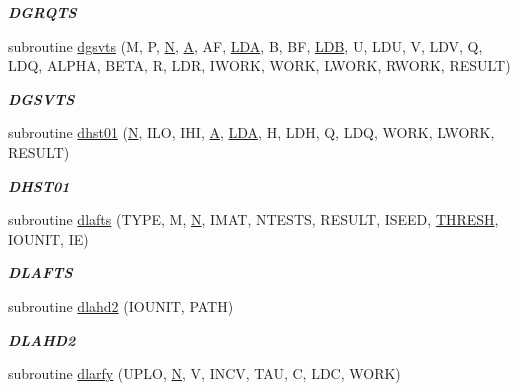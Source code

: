 \begin{DoxyCompactItemize}
\begin{DoxyCompactList}\small\item\em {\bfseries D\+G\+R\+Q\+T\+S} \end{DoxyCompactList}\item 
subroutine \hyperlink{group__double__eig_gae3ad62ba253b56ff68e7007244ce988e}{dgsvts} (M, P, \hyperlink{polmisc_8c_a0240ac851181b84ac374872dc5434ee4}{N}, \hyperlink{classA}{A}, A\+F, \hyperlink{example__user_8c_ae946da542ce0db94dced19b2ecefd1aa}{L\+D\+A}, B, B\+F, \hyperlink{example__user_8c_a50e90a7104df172b5a89a06c47fcca04}{L\+D\+B}, U, L\+D\+U, V, L\+D\+V, Q, L\+D\+Q, A\+L\+P\+H\+A, B\+E\+T\+A, R, L\+D\+R, I\+W\+O\+R\+K, W\+O\+R\+K, L\+W\+O\+R\+K, R\+W\+O\+R\+K, R\+E\+S\+U\+L\+T)
\begin{DoxyCompactList}\small\item\em {\bfseries D\+G\+S\+V\+T\+S} \end{DoxyCompactList}\item 
subroutine \hyperlink{group__double__eig_ga2c2bc3739bff16d2f68bcce82a72e5bb}{dhst01} (\hyperlink{polmisc_8c_a0240ac851181b84ac374872dc5434ee4}{N}, I\+L\+O, I\+H\+I, \hyperlink{classA}{A}, \hyperlink{example__user_8c_ae946da542ce0db94dced19b2ecefd1aa}{L\+D\+A}, H, L\+D\+H, Q, L\+D\+Q, W\+O\+R\+K, L\+W\+O\+R\+K, R\+E\+S\+U\+L\+T)
\begin{DoxyCompactList}\small\item\em {\bfseries D\+H\+S\+T01} \end{DoxyCompactList}\item 
subroutine \hyperlink{group__double__eig_ga6f9c26a927bb292ac5cab99adc1a357c}{dlafts} (T\+Y\+P\+E, M, \hyperlink{polmisc_8c_a0240ac851181b84ac374872dc5434ee4}{N}, I\+M\+A\+T, N\+T\+E\+S\+T\+S, R\+E\+S\+U\+L\+T, I\+S\+E\+E\+D, \hyperlink{zlaqgs_8c_a0656018abfc9fa2821827415f5d5ea57}{T\+H\+R\+E\+S\+H}, I\+O\+U\+N\+I\+T, I\+E)
\begin{DoxyCompactList}\small\item\em {\bfseries D\+L\+A\+F\+T\+S} \end{DoxyCompactList}\item 
subroutine \hyperlink{group__double__eig_gaf5ca6e066facb65a20568f3b790f1624}{dlahd2} (I\+O\+U\+N\+I\+T, P\+A\+T\+H)
\begin{DoxyCompactList}\small\item\em {\bfseries D\+L\+A\+H\+D2} \end{DoxyCompactList}\item 
subroutine \hyperlink{group__double__eig_ga7a374be57f1611d886c1ac0a6999351d}{dlarfy} (U\+P\+L\+O, \hyperlink{polmisc_8c_a0240ac851181b84ac374872dc5434ee4}{N}, V, I\+N\+C\+V, T\+A\+U, C, L\+D\+C, W\+O\+R\+K)

\end{DoxyCompactItemize}
